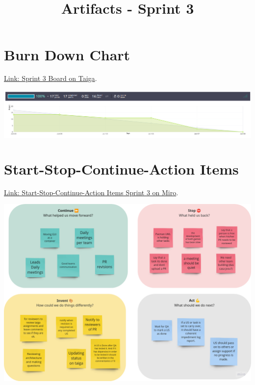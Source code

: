 \documentclass{article}
\title{Artifacts - Sprint 3}
\date{}
\begin{document}
\maketitle

\hypertarget{burndownchart-s3}{
\section{Burn Down Chart}\label{Burn Down Chart S3}}
\href{https://tree.taiga.io/project/joseluis-teran-coffeetime/taskboard/sprint-3-8974}{Link: Sprint 3 Board on Taiga}.

\includegraphics[width=\textwidth]{burndown-s3.png}

\hypertarget{startstopcontinueactionitems-s3}{
\section{Start-Stop-Continue-Action Items}\label{Start-Stop-Continue-Action Items S2}}
\href{https://miro.com/app/board/uXjVKDO7l8M=/?moveToWidget=3458764590247889881&cot=14}{Link: Start-Stop-Continue-Action Items Sprint 3 on Miro}.

\includegraphics[width=\textwidth]{retrospective-s3.png}
\end{document}
